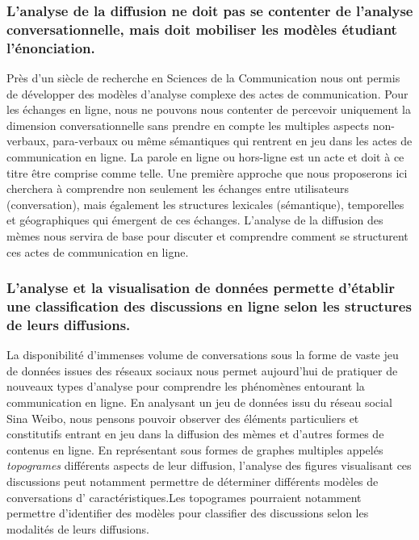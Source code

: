 \subsubsection{L'analyse de la diffusion ne doit pas se contenter de l'analyse conversationnelle, mais doit mobiliser les modèles étudiant l'énonciation.}

Près d'un siècle de recherche en Sciences de la Communication nous ont permis de développer des modèles d'analyse complexe des actes de communication. Pour les échanges en ligne, nous ne pouvons nous contenter de percevoir uniquement la dimension conversationnelle sans prendre en compte les multiples aspects non-verbaux, para-verbaux ou même sémantiques qui rentrent en jeu dans les actes de communication en ligne. La parole en ligne ou hors-ligne est un acte et doit à ce titre être comprise comme telle. Une première approche que nous proposerons ici cherchera à comprendre non seulement les échanges entre utilisateurs (conversation), mais également les structures lexicales (sémantique), temporelles et géographiques qui émergent de ces échanges. L'analyse de la diffusion des mèmes nous servira de base pour discuter et comprendre comment se structurent ces actes de communication en ligne.


\subsubsection{L'analyse et la visualisation de données permette d'établir une classification des discussions en ligne selon les structures de leurs diffusions.}

La disponibilité d'immenses volume de conversations sous la forme de vaste jeu de données issues des réseaux sociaux nous permet aujourd'hui de pratiquer de nouveaux types d'analyse pour comprendre les phénomènes entourant la communication en ligne. En analysant un jeu de données issu du réseau social Sina Weibo, nous pensons pouvoir observer des éléments particuliers et constitutifs entrant en jeu dans la diffusion des mèmes et d'autres formes de contenus en ligne. En représentant sous formes de graphes multiples appelés \textit{topogrames} différents aspects de leur diffusion, l{\textquoteright}analyse des figures visualisant ces discussions peut notamment permettre de déterminer différents modèles de conversations d{\textquoteright} caractéristiques.Les topogrames pourraient notamment permettre d'identifier des modèles pour classifier des discussions selon les modalités de leurs diffusions. 

